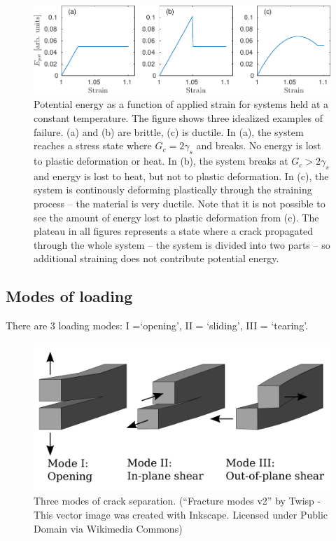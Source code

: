 \begin{figure}
\centering
\includegraphics[width=\textwidth]{../figures/thesis/idealized_fracture_e_pot.pdf}
\caption{Potential energy as a function of applied strain for systems held at a constant temperature. The figure shows three idealized examples of failure. (a) and (b) are brittle, (c) is ductile. In (a), the system reaches a stress state where $G_c = 2\gamma_s$ and breaks. No energy is lost to plastic deformation or heat. In (b), the system breaks at $G_c > 2\gamma_s$ and energy is lost to heat, but not to plastic deformation. In (c), the system is continously deforming plastically through the straining process -- the material is very ductile. Note that it is not possible to see the amount of energy lost to plastic deformation from (c). The plateau in all figures represents a state where a crack propagated through the whole system -- the system is divided into two parts -- so additional straining does not contribute potential energy. }
\end{figure}

\subsection{Modes of loading}
There are 3 loading modes: I =`opening', II = `sliding', III = `tearing'. 

\begin{figure}
\includegraphics[width=\textwidth]{../figures/thesis/Fracture_modes_v2.pdf}
\caption{Three modes of crack separation. (``Fracture modes v2'' by Twisp - This vector image was created with Inkscape. Licensed under Public Domain via Wikimedia Commons)}
\end{figure}

